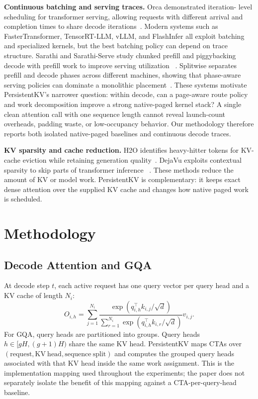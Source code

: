 \documentclass[10pt]{article}
\begin{document}
\textbf{Continuous batching and serving traces.} Orca demonstrated iteration-
level scheduling for transformer serving, allowing requests with different
arrival and completion times to share decode iterations~\cite{yu2022orca}.
Modern systems such as FasterTransformer, TensorRT-LLM, vLLM, and FlashInfer
all exploit batching and specialized kernels, but the best batching policy can
depend on trace structure. Sarathi and Sarathi-Serve study chunked prefill and
piggybacking decode with prefill work to improve serving utilization
~\cite{agrawal2023sarathi,agrawal2024sarathiserve}. Splitwise separates
prefill and decode phases across different machines, showing that phase-aware
serving policies can dominate a monolithic placement~\cite{splitwise2023}.
These systems motivate PersistentKV's narrower question: within decode, can a
page-aware route policy and work decomposition improve a strong native-paged
kernel stack? A single clean attention call with one sequence length cannot
reveal launch-count overheads, padding waste, or low-occupancy behavior. Our
methodology therefore reports both isolated native-paged baselines and
continuous decode traces.

\textbf{KV sparsity and cache reduction.} H2O identifies heavy-hitter tokens
for KV-cache eviction while retaining generation quality~\cite{zhang2023h2o}.
DejaVu exploits contextual sparsity to skip parts of transformer inference
~\cite{liu2023dejavu}. These methods reduce the amount of KV or model work.
PersistentKV is complementary: it keeps exact dense attention over the supplied
KV cache and changes how native paged work is scheduled.

\section{Methodology}

\subsection{Decode Attention and GQA}

At decode step $t$, each active request has one query vector per query head and
a KV cache of length $N_i$:
\begin{equation}
O_{i,h} =
\sum_{j=1}^{N_i}
\frac{\exp(q_{i,h}^{\top} k_{i,j}/\sqrt{d})}
{\sum_{r=1}^{N_i}\exp(q_{i,h}^{\top} k_{i,r}/\sqrt{d})}
v_{i,j}.
\end{equation}
For GQA, query heads are partitioned into groups. Query heads
$h \in [gH, (g+1)H)$ share the same KV head. PersistentKV maps CTAs over
$(\mathrm{request}, \mathrm{KV\ head}, \mathrm{sequence\ split})$ and computes
the grouped query heads associated with that KV head inside the same work
assignment. This is the implementation mapping used throughout the experiments;
the paper does not separately isolate the benefit of this mapping against a
CTA-per-query-head baseline.
\end{document}

